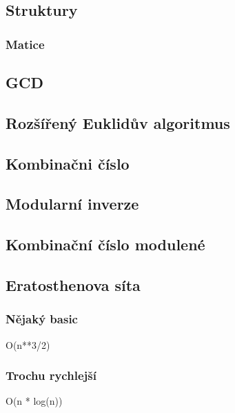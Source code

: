 \documentclass[10pt, a4paper]{article}
\begin{document}
\subsection{Struktury}
\subsubsection{Matice}


\subsection{GCD}


\subsection{Rozšířený Euklidův algoritmus}


\subsection{Kombinačni číslo}


\subsection{Modularní inverze}


\subsection{Kombinační číslo modulené}


\subsection{Eratosthenova síta}
\subsubsection{Nějaký basic}
O(n**3/2)


\subsubsection{Trochu rychlejší}
O(n * log(n))

\end{document}
